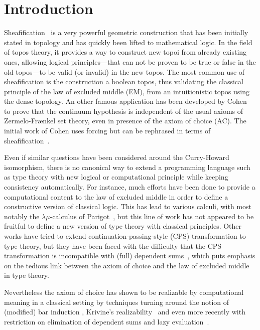 \documentclass[conference]{IEEEtran}
\begin{document}

\section{Introduction}
\label{sec:intro}

Sheafification~\cite{maclanemoerdijk} is a very powerful geometric
construction that has been initially stated in topology and has
quickly been lifted to mathematical logic.
%
In the field of topos theory, it provides a way to construct new topoi
from already existing ones, allowing logical principles---that can not
be proven to be true or false in the old topos---to be valid (or
invalid) in the new topos.
%
The most common use of sheafification is the construction a boolean
topos, thus validating the classical principle of the law of excluded
middle (EM), from an intuitionistic topos using the dense topology. 
%
An other famous application has been developed by
Cohen~\cite{cohen1966} to prove that the continuum hypothesis is
independent of the usual axioms of Zermelo-Fr\ae nkel set theory, even
in presence of the axiom of choice (AC). The initial work of Cohen
uses forcing but can be rephrased in terms of
sheafification~\cite{maclanemoerdijk}.

Even if similar questions have been considered around the Curry-Howard
isomorphism, there is no canonical way to extend a programming
language such as type theory with new logical or computational
principle while keeping consistency automatically.
%
For instance, much efforts have been done to provide a computational
content to the law of excluded middle in order to define a
constructive version of classical logic. This has lead to various
calculi, with most notably the $\lambda \mu$-calculus of
Parigot~\cite{parigot1993classical}, but this line of work has not
appeared to be fruitful to define a new version of type theory with
classical principles.
%
Other works have tried to extend continuation-passing-style (CPS)
transformation to type theory, but they have been faced with the
difficulty that the CPS transformation is incompatible with (full) dependent
sums~\cite{barthe2002cps}, which puts emphasis on the tedious link
between the axiom of choice and the law of excluded middle in type theory.

Nevertheless the axiom of choice has shown to be realizable by
computational meaning in a classical setting by techniques turning
around the notion of (modified) bar induction
\cite{berardi1998computational}, Krivine's
realizability~\cite{krivine2003dependent} and even more recently with
restriction on elimination of dependent sums and lazy
evaluation~\cite{herbelin2012constructive}.
%
\end{document}
